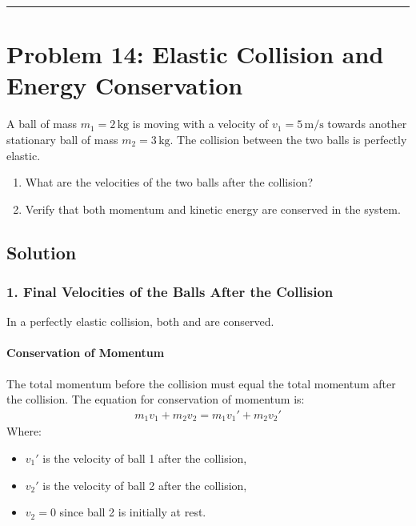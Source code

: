 \documentclass[letterpaper,10pt,english]{jupyterBook}
\begin{document}
\bigskip\hrule\bigskip



\section{Problem 14: Elastic Collision and Energy Conservation}
\label{\detokenize{prerequisites:problem-14-elastic-collision-and-energy-conservation}}
\sphinxAtStartPar
A ball of mass \(m_1 = 2 \, \text{kg}\) is moving with a velocity of \(v_1 = 5 \, \text{m/s}\) towards another stationary ball of mass \(m_2 = 3 \, \text{kg}\). The collision between the two balls is perfectly elastic.
\begin{enumerate}
%
\item {} 
\sphinxAtStartPar
What are the velocities of the two balls after the collision?

\item {} 
\sphinxAtStartPar
Verify that both momentum and kinetic energy are conserved in the system.

\end{enumerate}


\subsection{Solution}
\label{\detokenize{prerequisites:id19}}

\subsubsection{1. Final Velocities of the Balls After the Collision}
\label{\detokenize{prerequisites:final-velocities-of-the-balls-after-the-collision}}
\sphinxAtStartPar
In a perfectly elastic collision, both  and  are conserved.


\paragraph{Conservation of Momentum}
\label{\detokenize{prerequisites:conservation-of-momentum}}
\sphinxAtStartPar
The total momentum before the collision must equal the total momentum after the collision. The equation for conservation of momentum is:
\begin{equation*}
\begin{split}
m_1 v_1 + m_2 v_2 = m_1 v_1' + m_2 v_2'
\end{split}
\end{equation*}
\sphinxAtStartPar
Where:
\begin{itemize}
\item {} 
\sphinxAtStartPar
\(v_1' \) is the velocity of ball 1 after the collision,

\item {} 
\sphinxAtStartPar
\(v_2' \) is the velocity of ball 2 after the collision,

\item {} 
\sphinxAtStartPar
\(v_2 = 0\) since ball 2 is initially at rest.

\end{itemize}
\end{document}
